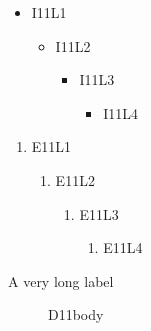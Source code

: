 \documentclass[11pt]{article}
\begin{document}
\begin{itemize}
\item I11L1
  \begin{itemize}
  \item I11L2
    \begin{itemize}
    \item I11L3
      \begin{itemize}
      \item I11L4
      \end{itemize}
    \end{itemize}
  \end{itemize}
\end{itemize}
\newpage
\begin{enumerate}
\item E11L1
  \begin{enumerate}
  \item E11L2
    \begin{enumerate}
    \item E11L3
      \begin{enumerate}
      \item E11L4
      \end{enumerate}
    \end{enumerate}
  \end{enumerate}
\end{enumerate}
\newpage
\begin{description}
\item[A very long label] D11body
\end{description}
\end{document}
